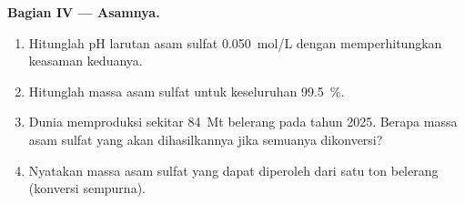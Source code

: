 \begin{problem}
\medskip
\noindent\textbf{Bagian IV --- Asamnya.}
\begin{enumerate}[resume]
  \item Hitunglah pH larutan asam sulfat \qty{0.050}{mol/L} dengan
        memperhitungkan keasaman keduanya.
  \item Hitunglah massa asam sulfat untuk  keseluruhan
        \qty{99.5}{\percent}.
  \item Dunia memproduksi sekitar \qty{84}{Mt} belerang pada tahun 2025.
        Berapa massa asam sulfat yang akan dihasilkannya jika semuanya
        dikonversi?
  \item Nyatakan massa asam sulfat yang dapat diperoleh dari satu ton
        belerang (konversi sempurna).
\end{enumerate}
\end{problem}
